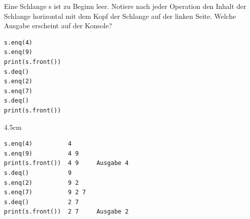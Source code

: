 \question[3]
Eine Schlange s ist zu Beginn leer. Notiere nach jeder Operation den Inhalt der Schlange horizontal mit dem Kopf der
Schlange auf der linken Seite. Welche Ausgabe erscheint auf der Konsole?
\begin{lstlisting}
s.enq(4)
s.enq(9)
print(s.front())
s.deq()
s.enq(2)
s.enq(7)
s.deq()
print(s.front())
\end{lstlisting}
\begin{solutionbox}{4.5cm}
\begin{lstlisting}[language={}]
s.enq(4)          4
s.enq(9)          4 9
print(s.front())  4 9     Ausgabe 4
s.deq()           9
s.enq(2)          9 2
s.enq(7)          9 2 7
s.deq()           2 7
print(s.front())  2 7     Ausgabe 2
\end{lstlisting}
\end{solutionbox}

